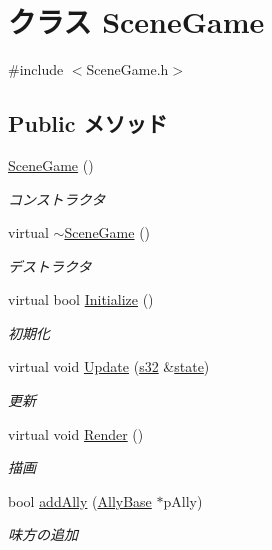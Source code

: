 \hypertarget{class_scene_game}{\section{クラス Scene\-Game}
\label{class_scene_game}
}


{\ttfamily \#include $<$Scene\-Game.\-h$>$}

\subsection*{Public メソッド}
\begin{DoxyCompactItemize}
\item 
\hyperlink{class_scene_game_adec58db9b09566fad2299eb755572767}{Scene\-Game} ()
\begin{DoxyCompactList}\small\item\em コンストラクタ \end{DoxyCompactList}\item 
virtual \hyperlink{class_scene_game_ae2813101b38f595f7ce11083cb23749b}{$\sim$\-Scene\-Game} ()
\begin{DoxyCompactList}\small\item\em デストラクタ \end{DoxyCompactList}\item 
virtual bool \hyperlink{class_scene_game_a505a872c33bc0c0ea826b9442d19d14f}{Initialize} ()
\begin{DoxyCompactList}\small\item\em 初期化 \end{DoxyCompactList}\item 
virtual void \hyperlink{class_scene_game_a756d87ac4d86f865e138bd8a15b58520}{Update} (\hyperlink{_main_8h_a0ce6887c26c1c49ad3be5710dd42bfd6}{s32} \&\hyperlink{_main_8cpp_a48e2c0184734db6ef7077da8cdb059df}{state})
\begin{DoxyCompactList}\small\item\em 更新 \end{DoxyCompactList}\item 
virtual void \hyperlink{class_scene_game_a412d68d4c94b297b02dcba0295b887b2}{Render} ()
\begin{DoxyCompactList}\small\item\em 描画 \end{DoxyCompactList}\item 
bool \hyperlink{class_scene_game_a54beea6929aa16ce23fa0b9da8b9e7c7}{add\-Ally} (\hyperlink{class_ally_base}{Ally\-Base} $\ast$p\-Ally)
\begin{DoxyCompactList}\small\item\em 味方の追加 \end{DoxyCompactList}\item 

\end{DoxyCompactItemize}
